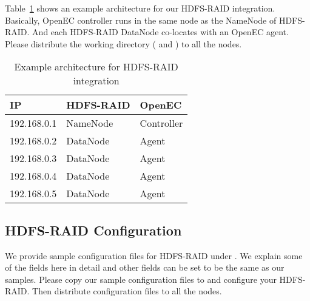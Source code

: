 \documentclass[letterpaper,12pt]{article}
\newcommand{\openec}{{\sf\small OpenEC}\xspace}
\begin{document}
Table~\ref{tab:hdfsraidarch} shows an example architecture for our HDFS-RAID integration.
Basically, \openec controller runs in the same node as the NameNode of HDFS-RAID.
And each HDFS-RAID DataNode co-locates with an \openec agent. Please distribute
the working directory ( and ) to all 
the nodes.

\begin{table}[h]
\centering
\footnotesize
\renewcommand{\arraystretch}{1.1}
\begin{tabular}{|l|l|l|}
\hline
IP & HDFS-RAID & OpenEC \\
\hline
\hline
192.168.0.1 & NameNode & Controller \\
\hline
192.168.0.2 & DataNode & Agent \\
\hline
192.168.0.3 & DataNode & Agent \\
\hline
192.168.0.4 & DataNode & Agent \\
\hline
192.168.0.5 & DataNode & Agent \\
\hline
\end{tabular}
\vspace{-3pt}
\caption{Example architecture for HDFS-RAID integration}
\label{tab:hdfsraidarch}
\end{table}

\subsection{HDFS-RAID Configuration}

We provide sample configuration files for HDFS-RAID under .
We explain some of the fields here in detail and other fields can be set to be the same as our
samples. Please copy our sample configuration files to  and configure your
HDFS-RAID. Then distribute configuration files to all the nodes. 
\end{document}
